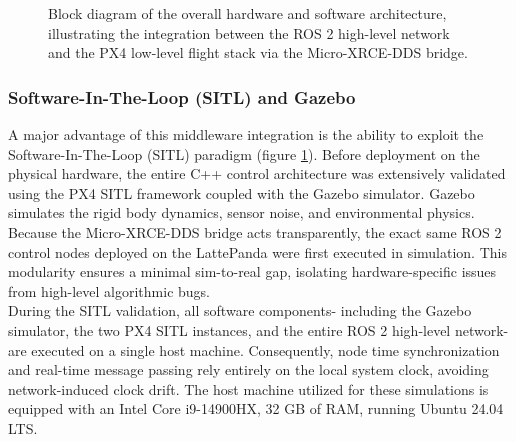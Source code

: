 \begin{figure}[htpb]
{
    }
    \caption{Block diagram of the overall hardware and software architecture, illustrating the integration between the ROS 2 high-level network and the PX4 low-level flight stack via the Micro-XRCE-DDS bridge.}
    \label{fig:architecture_diagram}
\end{figure}
\subsubsection{Software-In-The-Loop (SITL) and Gazebo}
A major advantage of this middleware integration is the ability to exploit the Software-In-The-Loop (SITL) paradigm (figure \ref{fig:architecture_diagram}). Before deployment on the physical hardware, the entire C++ control architecture was extensively validated using the PX4 SITL framework coupled with the Gazebo simulator. Gazebo simulates the rigid body dynamics, sensor noise, and environmental physics.
\\Because the Micro-XRCE-DDS bridge acts transparently, the exact same ROS 2 control nodes deployed on the LattePanda were first executed in simulation. This modularity ensures a minimal sim-to-real gap, isolating hardware-specific issues from high-level algorithmic bugs.
\\During the SITL validation, all software components- including the Gazebo simulator, the two PX4 SITL instances, and the entire ROS 2 high-level network- are executed on a single host machine. Consequently, node time synchronization and real-time message passing rely entirely on the local system clock, avoiding network-induced clock drift. The host machine utilized for these simulations is equipped with an Intel Core i9-14900HX, 32 GB of RAM, running Ubuntu 24.04 LTS.
